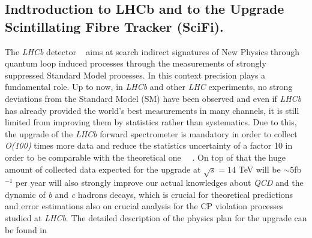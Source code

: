 \documentclass[paper=a4, fontsize=10pt]{scrartcl}
\numberwithin{equation}{section}		%
\numberwithin{figure}{section}			%
\numberwithin{table}{section}				%
\begin{document}
\subsection{Indtroduction to LHCb and to the Upgrade Scintillating Fibre Tracker (SciFi).}
The \textit{LHCb} detector ~\cite{Blake1} aims at search indirect signatures of New Physics through quantum loop induced processes through the measurements of strongly suppressed Standard Model processes.
In this context precision plays a fundamental role. 
Up to now, in \textit{LHCb} and other \textit{LHC} experiments, no strong deviations from the Standard Model (SM) have been observed and even if \textit{LHCb} has already provided the world's best measurements in many channels, it is still limited from improving them by statistics rather than systematics. Due to this, the upgrade of the \textit{LHCb} forward spectrometer is mandatory in order to collect \textit{O(100)} times more data and reduce the statistics uncertainty of a factor 10 in order to be comparable with the theoretical one ~\cite{Blake2}~\cite{Blake3}. On top of that the huge amount of collected data expected for the upgrade at $\sqrt{s} = 14$ TeV will be $\sim 5$fb$^{-1}$ per year  will also strongly improve our actual knowledges about \textit{QCD} and the dynamic of \textit{b} and \textit{c} hadrons decays, which is crucial for theoretical predictions and error estimations also on crucial analysis for the CP violation processes studied at \textit{LHCb}. The detailed description of the physics plan for the upgrade can be found in ~\cite{LetterIntent}
\end{document}
